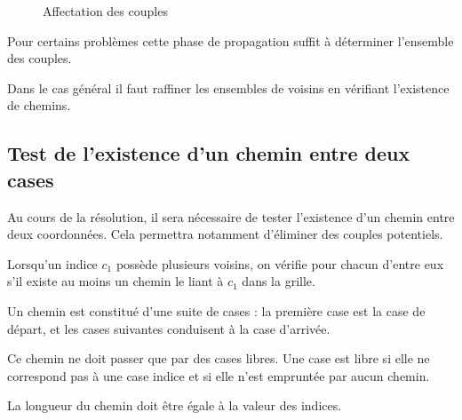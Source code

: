 \begin{figure}[h]

  \centering  
  \caption{Affectation des couples}
  \label{affectation1}
\end{figure}

Pour certains problèmes cette phase de propagation suffit à déterminer l'ensemble des couples.

Dans le cas général il faut raffiner les ensembles de voisins en vérifiant l'existence de chemins.

\subsection{Test de l'existence d'un chemin entre deux cases}

Au cours de la résolution, il sera nécessaire de tester l'existence d'un chemin entre deux coordonnées. Cela permettra notamment d'éliminer des couples potentiels.

Lorsqu'un indice $c_1$ possède plusieurs voisins, on vérifie pour chacun d'entre eux s'il existe au moins un chemin le liant à $c_1$ dans la grille. 

Un chemin est constitué d'une suite de cases : la première case est la case de départ, et les cases suivantes conduisent à la case d'arrivée. 

Ce chemin ne doit passer que par des cases libres. Une case est libre si elle ne correspond pas à une case indice et si elle n'est empruntée par aucun chemin.

La longueur du chemin doit être égale à la valeur des indices.

